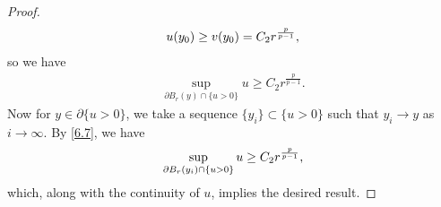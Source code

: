 \documentclass[10pt,a4paper]{amsart}
\begin{document}
\begin{proof}
		\begin{align}
			u(y_{0})\geq v(y_{0})=C_2 r^{\frac{p}{p-1}},\notag
		\end{align}
		so we have
		\begin{align}\label{6.7}
			\sup_{\partial B_{r}(y)\cap\{u>0\}}u\geq C_2r^{\frac{p}{p-1}}.
		\end{align}
		Now for $y \in \partial\{u > 0\}$, we take a sequence $\{y_i\} \subset \{u > 0\}$ such that $y_i \to y$ as $i \to \infty$. By \eqref{6.7}, we have
		\begin{align}
			\sup_{\partial B_r(y_i) \cap \{u > 0\}} u \geq C_2 r^{\frac{p}{p-1}},\notag
		\end{align}
		which, along with the continuity of $u$, implies the desired result.
	\end{proof}
\end{document}

